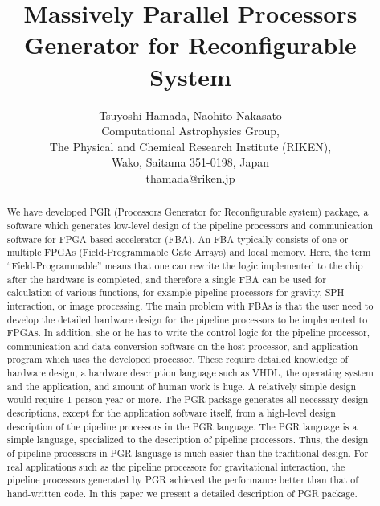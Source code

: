 \documentclass[times, 10pt,twocolumn]{article}
\begin{document}
\title{Massively Parallel Processors Generator for Reconfigurable System}

\author{Tsuyoshi Hamada, Naohito Nakasato\\
Computational Astrophysics Group,\\
The Physical and Chemical Research Institute (RIKEN),\\
Wako, Saitama 351-0198, Japan\\
thamada@riken.jp
}

\maketitle
\thispagestyle{empty}

\begin{abstract}
We have developed PGR (Processors Generator for Reconfigurable system) package, a
software which generates low-level design of the pipeline processors
and communication software for FPGA-based accelerator (FBA).
An FBA typically consists of one or multiple FPGAs (Field-Programmable
Gate Arrays) and local memory. Here, the term
``Field-Programmable'' means that one can rewrite the logic
implemented to the chip after the hardware is completed, and therefore
a single FBA can be used for calculation of various functions, for
example pipeline processors for gravity, SPH interaction, or image
processing. The main problem with FBAs is that the user need to
develop the detailed hardware design for the pipeline processors to be
implemented to FPGAs. In addition, she or he has to write the
control logic for the pipeline processor, communication and data conversion
software on the host processor, and application program which uses the
developed processor. These require detailed knowledge of hardware
design, a hardware description language such as VHDL, the operating
system and the application, and amount of human work is huge. A
relatively simple design would require 1 person-year or more.  The
PGR package generates all necessary design descriptions, except for
the application software itself, from a high-level design description
of the pipeline processors in the PGR language. The PGR language is a
simple language, specialized to the description of pipeline
processors. Thus, the design of pipeline processors in PGR language is
much easier than the traditional design. For real applications such as
the pipeline processors for gravitational interaction, the pipeline processors
generated by PGR achieved the performance better than that of
hand-written code. In this paper we present a detailed description of PGR package.
\end{abstract}
\end{document}

